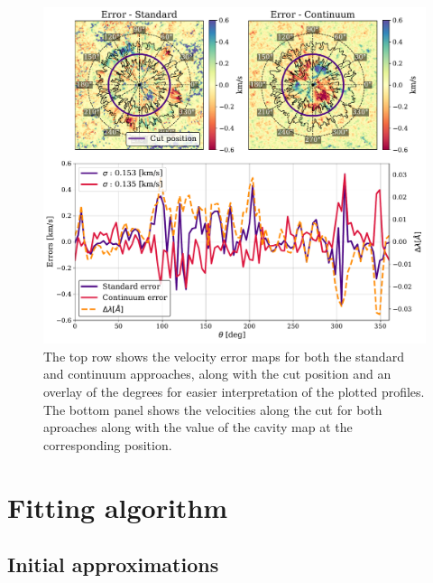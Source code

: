 \begin{figure}
  \begin{minipage}[c]{0.7\textwidth}
    \includegraphics[width=\textwidth]{figures/Mancha/circular_cut_standard_cont.pdf}
  \end{minipage}\hfill\hfill
  \begin{minipage}[c]{0.27\textwidth}
    \caption{
      The top row shows the velocity error maps for both the standard and continuum approaches, along with the cut position and an overlay of the degrees for easier interpretation of the plotted profiles. The bottom panel shows the velocities along the cut for both aproaches along with the value of the cavity map at the corresponding position.          
    \label{fig_mancha: verror_circular_cut}} 
  \end{minipage}
\end{figure}




\section{Fitting algorithm}
\subsection{\label{eta_corr_susec: etalon_transmission}Initial approximations}


